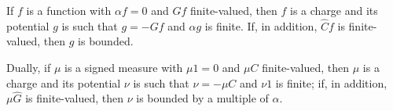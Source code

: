 If $f$ is a function with $\alpha f = 0$ and $Gf$ finite-valued, then $f$ is a charge and its potential $g$ is such that $g = -Gf$ and $\alpha g$ is finite. If, in addition, $\hat{C}f$ is finite-valued, then $g$ is bounded.

Dually, if $\mu$ is a signed measure with $\mu 1 = 0$ and $\mu C$ finite-valued, then $\mu$ is a charge and its potential $\nu$ is such that $\nu = -\mu C$ and $\nu 1$ is finite; if, in addition, $\mu \hat{G}$ is finite-valued, then $\nu$ is bounded by a multiple of $\alpha$.
